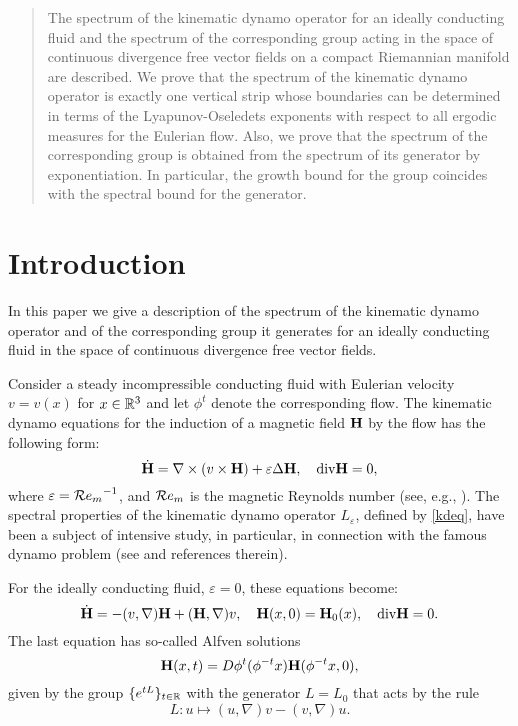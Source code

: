 \begin{abstract}
The spectrum of the kinematic dynamo operator
for an ideally
conducting fluid and the spectrum of the
corresponding group acting in the space of
continuous divergence
free vector fields on a compact Riemannian manifold
are described.
We prove that the spectrum
of the kinematic
dynamo operator is exactly one vertical strip whose
boundaries can be determined in terms of
the Lyapunov-Oseledets exponents
with respect to all ergodic measures for the Eulerian flow.
Also, we prove that the spectrum of the corresponding group is
obtained from the spectrum of its generator by
exponentiation. In particular, the growth bound for
the group coincides with the spectral bound for
the generator.
\end{abstract}

\section{Introduction}
In this paper we give a  description of the
spectrum of the kinematic dynamo operator
and of the
corresponding group it generates
for an ideally conducting fluid
in the
space of continuous divergence free vector fields.


Consider a steady incompressible conducting
fluid with Eulerian velocity $v=v(x)$
for $x\in \bbR^3$ and let $\phi^t$ denote the corresponding flow.
The kinematic dynamo equations for the induction of
a magnetic field ${\bf H}$ by the flow has the
following form:
\begin{equation}\label{kdeq}
 \dot{\bf H}  =  \nabla\times (v\times {\bf
H}) +  \varepsilon \Delta {\bf H},\quad
 \div{\bf H}  = 0,
\end{equation}
where $\varepsilon= {{\cal R}e_m}^{-1}$, and ${\cal R}e_m$ is the
magnetic Reynolds number (see, e.g., \cite[Ch.~6]{Moffatt}).
The spectral properties of the kinematic dynamo operator
$L_\varepsilon$, defined by \eqref{kdeq}, have been a subject of
intensive study, in particular, in connection with
the famous dynamo problem (see \cite{Arnold,AZRS,BC,FV,MRS,Vishik}
and references therein).

For the
ideally conducting fluid, $\varepsilon =0$,
these equations become:
\begin{equation}\label{kde}
\dot{\bf H}= - (v,\nabla) {\bf H} +
( {\bf H}, \nabla ) v,
\quad {\bf H}(x,0)={\bf H}_0(x),\quad \div{\bf H}  = 0.
\end{equation}
The last equation has \cite{Moffatt} so-called Alfven solutions
$${\bf H}(x,t)=D\phi^t(\phi^{-t}x){\bf H} (\phi^{-t}x,0),$$
given by the group $\{e^{tL}\}_{t\in\bbR}$ with the generator
$L=L_0$ that acts by the rule
\begin{equation}\label{defL}
L: u\mapsto  (u,\nabla)v - (v,\nabla) u.
\end{equation}

